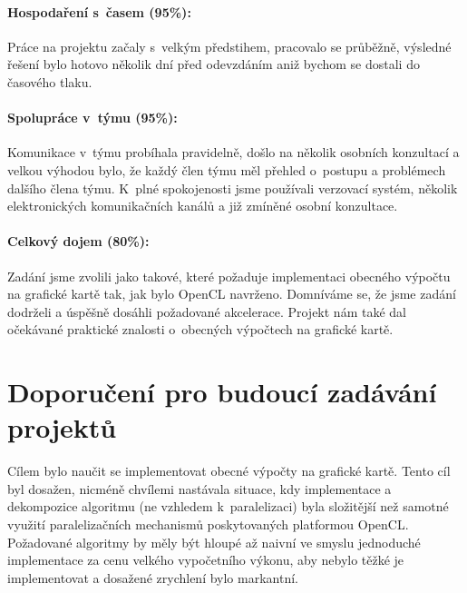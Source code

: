\documentclass[11pt,a4paper]{article}
\begin{document}
\paragraph{Hospodaření s~časem (95\%):}
Práce na projektu začaly s~velkým předstihem, pracovalo se průběžně, výsledné řešení bylo hotovo několik dní před odevzdáním aniž bychom se dostali do časového tlaku.

\paragraph{Spolupráce v~týmu (95\%):}
Komunikace v~týmu probíhala pravidelně, došlo na několik osobních konzultací a velkou výhodou bylo, že každý člen týmu měl přehled o~postupu a problémech dalšího člena týmu. K~plné spokojenosti jsme používali verzovací systém, několik elektronických komunikačních kanálů a již zmíněné osobní konzultace.

\paragraph{Celkový dojem (80\%):}
Zadání jsme zvolili jako takové, které požaduje implementaci obecného výpočtu na grafické kartě tak, jak bylo OpenCL navrženo. Domníváme se, že jsme zadání dodrželi a úspěšně dosáhli požadované akcelerace. Projekt nám také dal očekávané praktické znalosti o~obecných výpočtech na grafické kartě.

\section{Doporučení pro budoucí zadávání projektů}
Cílem bylo naučit se implementovat obecné výpočty na grafické kartě. Tento cíl byl dosažen, nicméně chvílemi nastávala situace, kdy implementace a dekompozice algoritmu (ne vzhledem k~paralelizaci) byla složitější než samotné využití paralelizačních mechanismů poskytovaných platformou OpenCL. Požadované algoritmy by měly být hloupé až naivní ve smyslu jednoduché implementace za cenu velkého vypočetního výkonu, aby nebylo těžké je implementovat a dosažené zrychlení bylo markantní.
\end{document}
